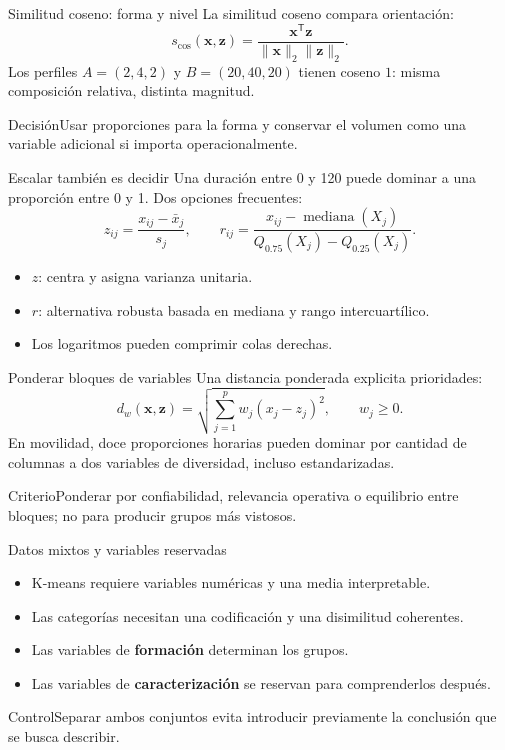 \documentclass[aspectratio=169,10pt]{beamer}
\newcommand{\concepto}[1]{\textcolor{UAPTeal}{\textbf{#1}}}
\begin{document}
\begin{frame}{Similitud coseno: forma y nivel}
  \small
  La similitud coseno compara orientación:
  \[s_{\cos}(\mathbf{x},\mathbf{z})=\frac{\mathbf{x}^{\mathsf T}\mathbf{z}}{\|\mathbf{x}\|_2\|\mathbf{z}\|_2}.\]
  Los perfiles $A=(2,4,2)$ y $B=(20,40,20)$ tienen coseno $1$: misma composición relativa, distinta magnitud.
  \begin{block}{Decisión}Usar proporciones para la forma y conservar el volumen como una variable adicional si importa operacionalmente.\end{block}
\end{frame}

\begin{frame}{Escalar también es decidir}
  \small
  Una duración entre 0 y 120 puede dominar a una proporción entre 0 y 1. Dos opciones frecuentes:
  \[z_{ij}=\frac{x_{ij}-\bar x_j}{s_j},\qquad r_{ij}=\frac{x_{ij}-\operatorname{mediana}(X_j)}{Q_{0.75}(X_j)-Q_{0.25}(X_j)}.\]
  \begin{itemize}
    \item $z$: centra y asigna varianza unitaria.
    \item $r$: alternativa robusta basada en mediana y rango intercuartílico.
    \item Los logaritmos pueden comprimir colas derechas.
  \end{itemize}
\end{frame}

\begin{frame}{Ponderar bloques de variables}
  \small
  Una distancia ponderada explicita prioridades:
  \[d_w(\mathbf{x},\mathbf{z})=\sqrt{\sum_{j=1}^{p}w_j(x_j-z_j)^2},\qquad w_j\geq0.\]
  En movilidad, doce proporciones horarias pueden dominar por cantidad de columnas a dos variables de diversidad, incluso estandarizadas.
  \begin{block}{Criterio}Ponderar por confiabilidad, relevancia operativa o equilibrio entre bloques; no para producir grupos más vistosos.\end{block}
\end{frame}

\begin{frame}{Datos mixtos y variables reservadas}
  \small
  \begin{itemize}
    \item K-means requiere variables numéricas y una media interpretable.
    \item Las categorías necesitan una codificación y una disimilitud coherentes.
    \item Las variables de \concepto{formación} determinan los grupos.
    \item Las variables de \concepto{caracterización} se reservan para comprenderlos después.
  \end{itemize}
  \begin{alertblock}{Control}Separar ambos conjuntos evita introducir previamente la conclusión que se busca describir.\end{alertblock}
\end{frame}
\end{document}
